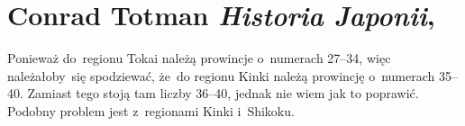 \documentclass[a4paper,11pt]{article}
\numberwithin{equation}{section}
\begin{document}
\VerSpaceTwo











\newpage

\section{Conrad Totman \textit{Historia Japonii},
  \cite{TotmanHistoriaJaponii2009}}


\vspace{0em}


\vspace{0em}


\noindent
{} Ponieważ do~regionu Tokai należą prowincje o~numerach 27--34,
więc należałoby~się spodziewać, że~do regionu Kinki należą prowincję
o~numerach 35--40. Zamiast tego stoją tam liczby 36--40, jednak nie wiem jak
to poprawić. Podobny problem jest z~regionami Kinki i~Shikoku.

\VerSpaceFour











\end{document}
